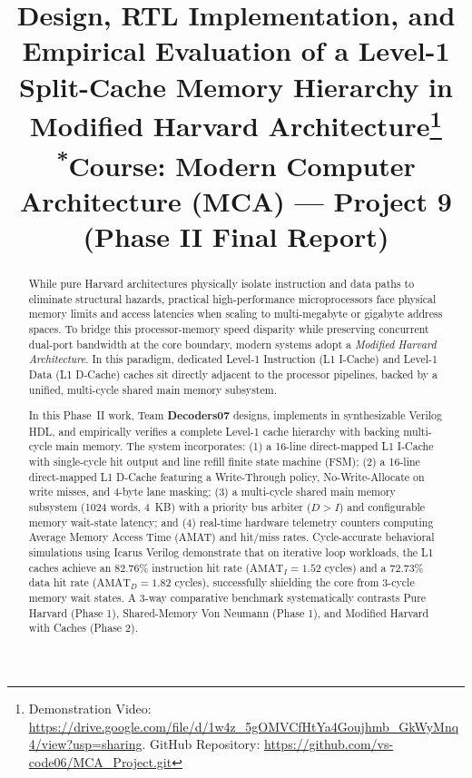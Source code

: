 \documentclass[conference]{IEEEtran}
\begin{document}
\title{Design, RTL Implementation, and Empirical Evaluation of a Level-1 Split-Cache Memory Hierarchy in Modified Harvard Architecture\thanks{Demonstration Video: \url{https://drive.google.com/file/d/1w4z_5gOMVCfHtYa4Goujhmb_GkWyMnq4/view?usp=sharing}. GitHub Repository: \url{https://github.com/vs-code06/MCA_Project.git}}\\
{\footnotesize \textsuperscript{*}Course: Modern Computer Architecture (MCA) --- Project 9 (Phase II Final Report)}}

\author{
}

\maketitle

\begin{abstract}
While pure Harvard architectures physically isolate instruction and data paths to eliminate structural hazards, practical high-performance microprocessors face physical memory limits and access latencies when scaling to multi-megabyte or gigabyte address spaces. To bridge this processor-memory speed disparity while preserving concurrent dual-port bandwidth at the core boundary, modern systems adopt a \textit{Modified Harvard Architecture}. In this paradigm, dedicated Level-1 Instruction (L1 I-Cache) and Level-1 Data (L1 D-Cache) caches sit directly adjacent to the processor pipelines, backed by a unified, multi-cycle shared main memory subsystem. 

In this Phase~II work, Team \textbf{Decoders07} designs, implements in synthesizable Verilog HDL, and empirically verifies a complete Level-1 cache hierarchy with backing multi-cycle main memory. The system incorporates: (1) a 16-line direct-mapped L1 I-Cache with single-cycle hit output and line refill finite state machine (FSM); (2) a 16-line direct-mapped L1 D-Cache featuring a Write-Through policy, No-Write-Allocate on write misses, and 4-byte lane masking; (3) a multi-cycle shared main memory subsystem (1024 words, 4~KB) with a priority bus arbiter ($D > I$) and configurable memory wait-state latency; and (4) real-time hardware telemetry counters computing Average Memory Access Time (AMAT) and hit/miss rates. Cycle-accurate behavioral simulations using Icarus Verilog demonstrate that on iterative loop workloads, the L1 caches achieve an $82.76\%$ instruction hit rate ($\text{AMAT}_I = 1.52$ cycles) and a $72.73\%$ data hit rate ($\text{AMAT}_D = 1.82$ cycles), successfully shielding the core from 3-cycle memory wait states. A 3-way comparative benchmark systematically contrasts Pure Harvard (Phase 1), Shared-Memory Von Neumann (Phase 1), and Modified Harvard with Caches (Phase 2).
\end{abstract}
\end{document}
